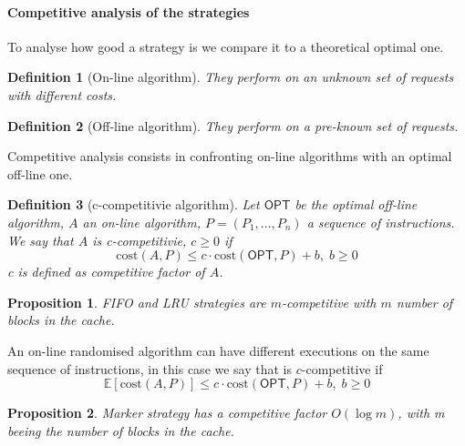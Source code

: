 \documentclass{report}
\newtheorem{defin}{Definition}[chapter]
\newtheorem{prop}{Proposition}[chapter]
\begin{document}
\paragraph{Competitive analysis of the strategies} To analyse how good a strategy is we compare it to a theoretical optimal one.
\begin{defin}[On-line algorithm]
    They perform on an unknown set of requests with different costs.
\end{defin}
\begin{defin}[Off-line algorithm]
    They perform on a pre-known set of requests.
\end{defin}
\noindent
Competitive analysis consists in confronting on-line algorithms with an optimal off-line one.
\begin{defin}[c-competitivie algorithm]
    Let \(\textsf{OPT}\) be the optimal off-line algorithm, \(A\) an on-line algorithm, \(P=(P_1,\dots,P_n)\) a sequence of instructions. We say that \(A\) is c-competitivie, \(c \geq 0\) if 
    \begin{equation}
        \text{cost}(A,P) \leq c \cdot \text{cost}(\textsf{OPT}, P) + b,\; b\geq 0
    \end{equation}
    c is defined as competitive factor of \(A\).
\end{defin}
\begin{prop}
    FIFO and LRU strategies are \(m\)-competitive with \(m\) number of blocks in the cache.
\end{prop}
\noindent
An on-line randomised algorithm can have different executions on the same sequence of instructions, in this case we say that is \(c\)-competitive if 
\begin{equation}
    \mathbb{E}[\text{cost}(A,P)] \leq c \cdot \text{cost}(\textsf{OPT}, P) + b,\; b\geq 0
\end{equation}
\begin{prop}
    Marker strategy has a competitive factor \(O(\log m)\), with m beeing the number of blocks in the cache.
\end{prop}
\end{document}
